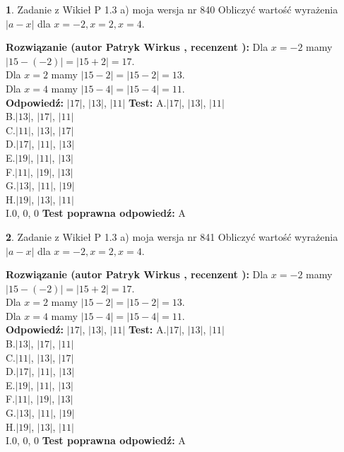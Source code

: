 \documentclass[12pt, a4paper]{article}
\theoremstyle{definition} %
\newtheorem{zad}{}
\newcommand{\zadStart}[1]{\begin{zad}#1\newline}
\newcommand{\zadStop}{\end{zad}}
\newcommand{\rozwStart}[2]{\noindent \textbf{Rozwiązanie (autor #1 , recenzent #2): }\newline}
\newcommand{\rozwStop}{\newline}
\newcommand{\odpStart}{\noindent \textbf{Odpowiedź:}\newline}
\newcommand{\odpStop}{\newline}
\newcommand{\testStart}{\noindent \textbf{Test:}\newline}
\newcommand{\testStop}{\newline}
\newcommand{\kluczStart}{\noindent \textbf{Test poprawna odpowiedź:}\newline}
\newcommand{\kluczStop}{\newline}
\begin{document}
\zadStart{Zadanie z Wikieł P 1.3 a) moja wersja nr 840}
Obliczyć wartość wyrażenia $|a - x|$ dla $x=-2,x=2,x=4$.
\zadStop
\rozwStart{Patryk Wirkus}{}
Dla $x = -2$ mamy $|15 - (-2)| = |15 + 2| = 17$.\\
Dla $x = 2$ mamy $|15 - 2| = |15 - 2| = 13$.\\
Dla $x = 4$ mamy $|15 - 4| = |15 - 4| = 11$.\\
\rozwStop
\odpStart
$|17|$, $|13|$, $|11|$
\odpStop
\testStart
A.$|17|$, $|13|$, $|11|$\\
B.$|13|$, $|17|$, $|11|$\\
C.$|11|$, $|13|$, $|17|$\\
D.$|17|$, $|11|$, $|13|$\\
E.$|19|$, $|11|$, $|13|$\\
F.$|11|$, $|19|$, $|13|$\\
G.$|13|$, $|11|$, $|19|$\\
H.$|19|$, $|13|$, $|11|$\\
I.$0$, $0$, $0$
\testStop
\kluczStart
A
\kluczStop



\zadStart{Zadanie z Wikieł P 1.3 a) moja wersja nr 841}
Obliczyć wartość wyrażenia $|a - x|$ dla $x=-2,x=2,x=4$.
\zadStop
\rozwStart{Patryk Wirkus}{}
Dla $x = -2$ mamy $|15 - (-2)| = |15 + 2| = 17$.\\
Dla $x = 2$ mamy $|15 - 2| = |15 - 2| = 13$.\\
Dla $x = 4$ mamy $|15 - 4| = |15 - 4| = 11$.\\
\rozwStop
\odpStart
$|17|$, $|13|$, $|11|$
\odpStop
\testStart
A.$|17|$, $|13|$, $|11|$\\
B.$|13|$, $|17|$, $|11|$\\
C.$|11|$, $|13|$, $|17|$\\
D.$|17|$, $|11|$, $|13|$\\
E.$|19|$, $|11|$, $|13|$\\
F.$|11|$, $|19|$, $|13|$\\
G.$|13|$, $|11|$, $|19|$\\
H.$|19|$, $|13|$, $|11|$\\
I.$0$, $0$, $0$
\testStop
\kluczStart
A
\kluczStop
\end{document}
